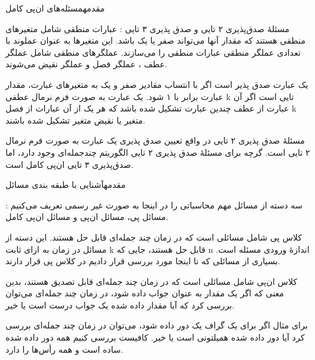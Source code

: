 \begin{itemframe-s}{مقدمه}{مسئله‌های ان‌پی کامل}
\decLineSpace[0mm] %
\item[-]
مسئلهٔ صدق‌پذیری ۲ تایی و صدق پذیری ۳ تایی : عبارات منطقی شامل متغیرهای منطقی هستند که مقدار آنها می‌تواند صفر یا یک باشد. این متغیرها به عنوان عملوند با تعدادی عملگر منطقی عبارات منطقی را می‌سازند. عملگرهای منطقی شامل عملگر عطف
\m{(\wedge)}
، عملگر فصل
\m{(\vee)}
و عملگر نقیض
\m{(\sim)}
می‌شوند.
\item[-]
یک عبارت صدق پذیر
است اگر با انتساب مقادیر صفر و یک به متغیرهای عبارت، مقدار عبارت برابر با ۱ شود. یک عبارت به صورت فرم نرمال عطفی k تایی است اگر آن عبارت از عطف چندین عبارت تشکیل شده باشد که هر یک از آن عبارات از فصل k متغیر یا نقیض متغیر تشکیل شده باشند.
\item[-]
مسئلهٔ صدق پذیری ۲ تایی در واقع تعیین صدق پذیری یک عبارت به صورت فرم نرمال ۲ تایی است. گرچه برای مسئلهٔ صدق پذیری ۲ تایی الگوریتم چندجمله‌ای وجود دارد، اما صدق‌پذیری ۳ تایی ان‌پی کامل است.
\end{itemframe-s}


\begin{itemframe-s}{مقدمه}{آشنایی با طبقه بندی مسائل}
\decLineSpace[0mm] %
\item[-]
سه دسته از مسائل مهم محاسباتی را در اینجا به صورت غیر رسمی تعریف می‌کنیم : مسائل پی، مسائل ان‌پی و مسائل ان‌پی کامل.
\item[-]
کلاس پی
شامل مسائلی است که در زمان چند جمله‌ای
قابل حل هستند. این دسته از مسائل در زمان
به ازای ثابت k قابل حل هستند، جایی که n اندازهٔ ورودی مسئله است. بسیاری از مسائلی که تا اینجا مورد بررسی قرار دادیم در کلاس پی قرار دارند.
\item[-]
کلاس ان‌پی
شامل مسائلی است که در زمان چند جمله‌ای قابل تصدیق
هستند، بدین معنی که اگر یک مقدار به عنوان جواب داده شود، در زمان چند جمله‌ای می‌توان بررسی کرد که آیا مقدار داده شده یک جواب درست است یا خیر.
\item[-]
برای مثال اگر برای یک گراف یک دور داده شود، می‌توان در زمان چند جمله‌ای بررسی کرد آیا دور داده شده همیلتونی است یا خیر. کافیست بررسی کنیم همه دور داده شده ساده است و همه رأس‌ها را دارد.
\end{itemframe-s}

